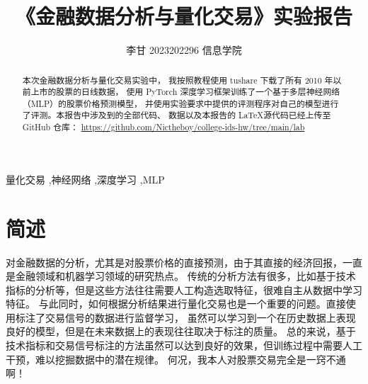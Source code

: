 \documentclass[final,5p,times,twocolumn,authoryear]{elsarticle}
\begin{document}
\begin{frontmatter}

       \title{《金融数据分析与量化交易》实验报告}

       \author[first]{李甘 2023202296 信息学院}

       \begin{abstract}
              本次金融数据分析与量化交易实验中，
              我按照教程使用 tushare 下载了所有 2010 年以前上市的股票的日线数据，
              使用 PyTorch 深度学习框架训练了一个基于多层神经网络（MLP）的股票价格预测模型，
              并使用实验要求中提供的评测程序对自己的模型进行了评测。本报告中涉及到的全部代码、
              数据以及本报告的 \LaTeX 源代码已经上传至 GitHub 仓库：
              \url{https://github.com/Nictheboy/college-ids-hw/tree/main/lab}
       \end{abstract}

       \begin{keyword}
              量化交易 \sep 神经网络 \sep 深度学习 \sep MLP



       \end{keyword}


\end{frontmatter}




\section{简述}
对金融数据的分析，尤其是对股票价格的直接预测，由于其直接的经济回报，一直是金融领域和机器学习领域的研究热点。
传统的分析方法有很多，比如基于技术指标的分析等，但是这些方法往往需要人工构造选取特征，很难自主从数据中学习特征。
与此同时，如何根据分析结果进行量化交易也是一个重要的问题。直接使用标注了交易信号的数据进行监督学习，
虽然可以学习到一个在历史数据上表现良好的模型，但是在未来数据上的表现往往取决于标注的质量。
总的来说，基于技术指标和交易信号标注的方法虽然可以达到良好的效果，但训练过程中需要人工干预，难以挖掘数据中的潜在规律。
何况，我本人对股票交易完全是一窍不通啊！
\end{document}
